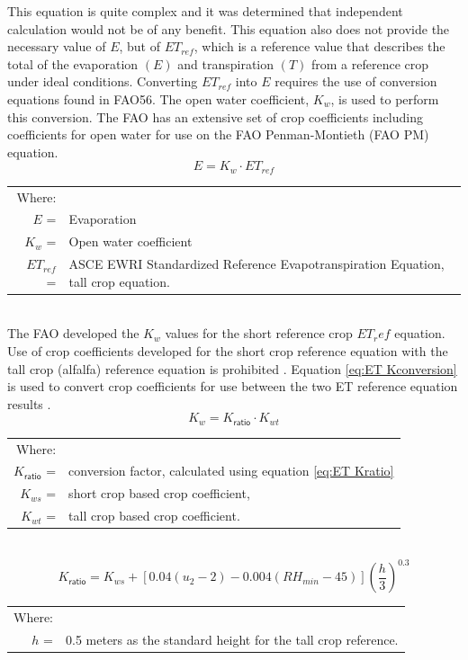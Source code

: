 This equation is quite complex and it was determined that independent calculation would not be of any benefit.  This equation also does not provide the necessary value of $ E $, but of  $ ET_{ref} $, which is a reference value that describes the total of the evaporation $ (E) $ and transpiration $ (T) $ from a reference crop under ideal conditions.  Converting $ ET_{ref} $ into $ E $ requires the use of conversion equations found in FAO56.  The open water coefficient, $K_w$, is used to perform this conversion.  The FAO has an extensive set of crop coefficients including coefficients for open water for use on the FAO Penman-Montieth (FAO PM) equation.  
\begin{equation}
\label{eq:ETcoef}
E=K_w \cdot ET_{ref}
\end{equation}
\begin{tabular}{r p{5.5in}}
Where:&\\
$E$ = & Evaporation\\
$K_w$ = & Open water coefficient\\
$ET_{ref}$ = & ASCE EWRI Standardized Reference Evapotranspiration Equation, tall crop equation.\\
\end{tabular}\\

The FAO developed the $K_w$ values for the short reference crop $ET_ref$ equation.  Use of crop coefficients developed for the short crop reference equation with the tall crop (alfalfa) reference equation is prohibited  \parencite{FAO56, Allen2011}.  Equation \ref{eq:ET Kconversion} is used to convert crop coefficients for use between the two ET reference equation results \parencite{FAO56}.
\begin{equation}
\label{eq:ET Kconversion}
	K_{w}=K_\mathsf{ratio} \cdot K_{wt}
\end{equation}
\begin{tabular}{r p{5.5in}}
Where:&\\
$K_\mathsf{ratio}$ =& conversion factor, calculated using equation \ref{eq:ET Kratio}\\
$K_{ws}$ =& short crop based crop coefficient, \\
$K_{wt}$ =& tall crop based crop coefficient.\\
\end{tabular}\\

\begin{equation}
\label{eq:ET Kratio}
	K_\mathsf{ratio}=K_{ws}+[0.04(u_2-2)-0.004(RH_{min}-45)] \left(\frac{h}{3} \right)^{0.3}
\end{equation}
\begin{tabular}{r l}
Where:&\\
$h$ =& 0.5 meters as the standard height for the tall crop reference.
\end{tabular}\\


